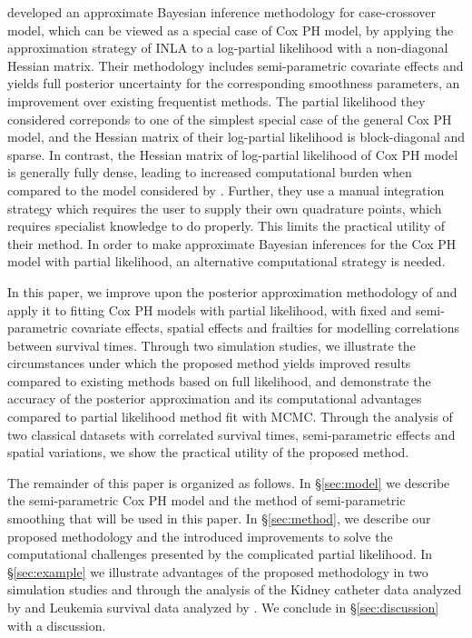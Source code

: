 \documentclass[ba]{imsart}
\begin{document}
\cite{casecross} developed an approximate Bayesian inference methodology for case-crossover model, which can be viewed as a special case of Cox PH model, by applying the approximation strategy of INLA to a log-partial likelihood with a non-diagonal Hessian matrix. 
Their methodology includes semi-parametric covariate effects and yields full posterior uncertainty for the corresponding smoothness parameters, an improvement over existing frequentist methods. The partial likelihood they considered correponds to one of the simplest special case of the general Cox PH model, and the Hessian matrix of their log-partial likelihood is block-diagonal and sparse. In contrast, the Hessian matrix of log-partial likelihood of Cox PH model is generally fully dense, leading to increased computational burden when compared to the model considered by \cite{casecross}. Further, they use a manual integration strategy which requires the user to supply their own quadrature points, which requires specialist knowledge to do properly. This limits the practical utility of their method. In order to make approximate Bayesian inferences for the Cox PH model with partial likelihood, an alternative computational strategy is needed.



In this paper, we improve upon the posterior approximation methodology of \cite{casecross} and apply it to fitting Cox PH models with partial likelihood, with fixed and semi-parametric covariate effects, spatial effects and frailties for modelling correlations between survival times. Through two simulation studies, we illustrate the circumstances under which the proposed method yields improved results compared to existing methods based on full likelihood, and demonstrate the accuracy of the posterior approximation and its computational advantages compared to partial likelihood method fit with MCMC. Through the analysis of two classical datasets with correlated survival times, semi-parametric effects and spatial variations, we show the practical utility of the proposed method.


The remainder of this paper is organized as follows. In \S\ref{sec:model} we describe the semi-parametric Cox PH model and the method of semi-parametric smoothing that will be used in this paper. In \S\ref{sec:method}, we describe our proposed methodology and the introduced improvements to solve the computational challenges presented by the complicated partial likelihood. In \S\ref{sec:example} we illustrate advantages of the proposed methodology in two simulation studies and through the analysis of the Kidney catheter data analyzed by \cite{kidney} and Leukemia survival data analyzed by \cite{inlacoxph}. We conclude in \S\ref{sec:discussion} with a discussion.
\end{document}
